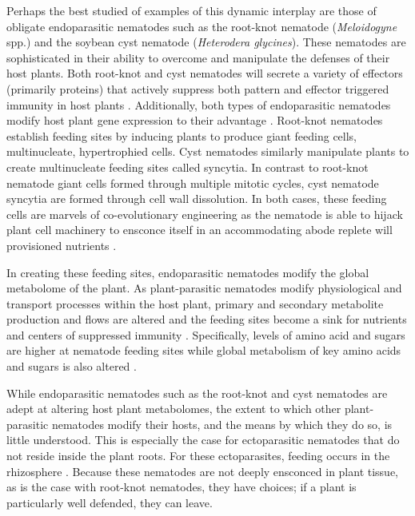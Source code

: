 \documentclass[9pt,lineno]{elife}
\begin{document}
Perhaps the best studied of examples of this dynamic interplay are those of obligate endoparasitic nematodes such as the root-knot nematode (\textit{Meloidogyne}  spp.) and the soybean cyst nematode (\textit{Heterodera glycines}).  These nematodes are sophisticated in their ability to overcome and manipulate the defenses of their host plants.  Both root-knot and cyst nematodes will secrete a variety of effectors (primarily proteins) that actively suppress both pattern and effector triggered immunity in host plants \citep{mitchum2013nematode, mantelin2015suppression, vanholme2004secretions, vieira2019plant}.  Additionally, both types of endoparasitic nematodes modify host plant gene expression to their advantage \citep{de2015plant}.  Root-knot nematodes establish feeding sites by inducing plants to produce giant feeding cells, multinucleate, hypertrophied cells. Cyst nematodes similarly manipulate plants to create multinucleate feeding sites  called syncytia. In contrast to root-knot nematode giant cells formed through multiple mitotic cycles, cyst nematode syncytia are formed through cell wall dissolution.   In both cases, these feeding cells are marvels of co-evolutionary engineering as the nematode is able to hijack plant cell machinery to ensconce itself in an accommodating abode replete will provisioned nutrients \citep{siddique2018parasitic, de2015plant,siddique2015metabolism}.  

In creating these feeding sites, endoparasitic nematodes modify the global metabolome of the plant.  As plant-parasitic nematodes modify physiological and transport processes within the host plant, primary and secondary metabolite production and flows are altered and the feeding sites become a sink for nutrients and centers of suppressed immunity \citep{bartlem2013vascularization}.  Specifically, levels of amino acid and sugars are higher at nematode feeding sites \citep{siddique2015metabolism} while global metabolism of key amino acids and sugars is also altered \citep{eloh2016untargeted, hofmann2010metabolic}.  


While endoparasitic nematodes such as the root-knot and cyst nematodes are adept at altering host plant metabolomes, the extent to which other plant-parasitic nematodes modify their hosts, and the means by which they do so, is little understood.  This is especially the case for ectoparasitic nematodes that do not reside inside the plant roots.  For these ectoparasites, feeding occurs in the rhizosphere \citep{sijmons1994parasitic}.  Because these nematodes are not deeply ensconced in plant tissue, as is the case with root-knot nematodes, they have choices; if a plant is particularly well defended, they can leave.  
\end{document}
